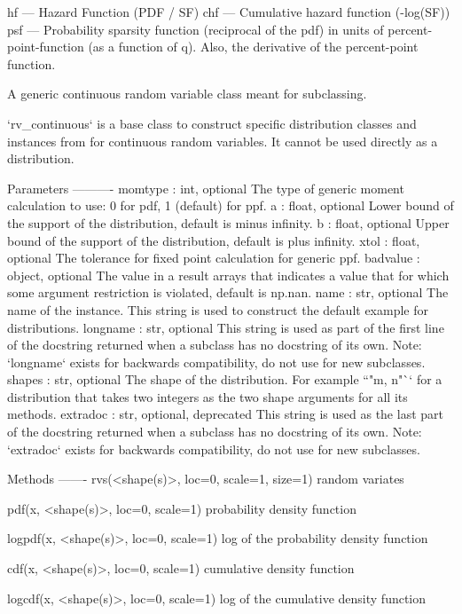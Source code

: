 hf --- Hazard Function (P\+D\+F / S\+F) chf --- Cumulative hazard function (-\/log(S\+F)) psf --- Probability sparsity function (reciprocal of the pdf) in units of percent-\/point-\/function (as a function of q). Also, the derivative of the percent-\/point function. \begin{DoxyVerb}A generic continuous random variable class meant for subclassing.

`rv_continuous` is a base class to construct specific distribution classes
and instances from for continuous random variables. It cannot be used
directly as a distribution.

Parameters
----------
momtype : int, optional
    The type of generic moment calculation to use: 0 for pdf, 1 (default)
    for ppf.
a : float, optional
    Lower bound of the support of the distribution, default is minus
    infinity.
b : float, optional
    Upper bound of the support of the distribution, default is plus
    infinity.
xtol : float, optional
    The tolerance for fixed point calculation for generic ppf.
badvalue : object, optional
    The value in a result arrays that indicates a value that for which
    some argument restriction is violated, default is np.nan.
name : str, optional
    The name of the instance. This string is used to construct the default
    example for distributions.
longname : str, optional
    This string is used as part of the first line of the docstring returned
    when a subclass has no docstring of its own. Note: `longname` exists
    for backwards compatibility, do not use for new subclasses.
shapes : str, optional
    The shape of the distribution. For example ``"m, n"`` for a
    distribution that takes two integers as the two shape arguments for all
    its methods.
extradoc :  str, optional, deprecated
    This string is used as the last part of the docstring returned when a
    subclass has no docstring of its own. Note: `extradoc` exists for
    backwards compatibility, do not use for new subclasses.

Methods
-------
rvs(<shape(s)>, loc=0, scale=1, size=1)
    random variates

pdf(x, <shape(s)>, loc=0, scale=1)
    probability density function

logpdf(x, <shape(s)>, loc=0, scale=1)
    log of the probability density function

cdf(x, <shape(s)>, loc=0, scale=1)
    cumulative density function

logcdf(x, <shape(s)>, loc=0, scale=1)
    log of the cumulative density function


\end{DoxyVerb}
